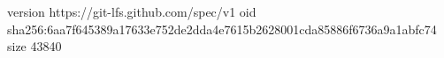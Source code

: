 version https://git-lfs.github.com/spec/v1
oid sha256:6aa7f645389a17633e752de2dda4e7615b2628001cda85886f6736a9a1abfc74
size 43840
